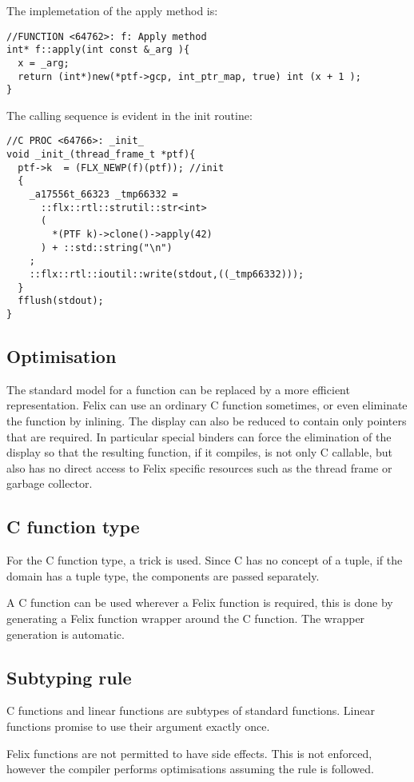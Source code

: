 \documentclass[oneside]{book}
\begin{document}
The implemetation of the apply method is:
\begin{verbatim}
//FUNCTION <64762>: f: Apply method
int* f::apply(int const &_arg ){
  x = _arg;
  return (int*)new(*ptf->gcp, int_ptr_map, true) int (x + 1 );
}
\end{verbatim}

The calling sequence is evident in the init routine:
\begin{verbatim}
//C PROC <64766>: _init_
void _init_(thread_frame_t *ptf){
  ptf->k  = (FLX_NEWP(f)(ptf)); //init
  {
    _a17556t_66323 _tmp66332 = 
      ::flx::rtl::strutil::str<int>
      (
        *(PTF k)->clone()->apply(42)
      ) + ::std::string("\n") 
    ;
    ::flx::rtl::ioutil::write(stdout,((_tmp66332)));
  }
  fflush(stdout);
}
\end{verbatim}

\subsection{Optimisation}
The standard model for a function can be replaced by a more efficient representation.
Felix can use an ordinary C function sometimes, or even eliminate the function
by inlining. The display can also be reduced to contain only pointers that are
required. In particular special binders can force the elimination of the display
so that the resulting function, if it compiles, is not only C callable, but also
has no direct access to Felix specific resources such as the thread frame or
garbage collector.

\subsection{C function type}
For the C function type, a trick is used. Since C has no concept of a tuple,
if the domain has a tuple type, the components are passed separately.

A C function can be used wherever a Felix function is required, this is done
by generating a Felix function wrapper around the C function. The wrapper
generation is automatic.

\subsection{Subtyping rule}
C functions and linear functions are subtypes of standard functions.
Linear functions promise to use their argument exactly once.

Felix functions are not permitted to have side effects. This is not
enforced, however the compiler performs optimisations assuming the rule
is followed.
\end{document}
